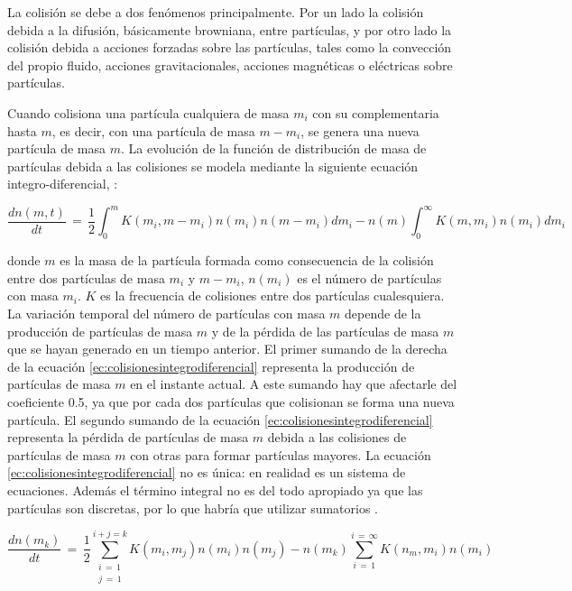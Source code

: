 \par La colisión se debe a dos fenómenos principalmente. Por un lado la colisión debida a la difusión, básicamente browniana, entre partículas, y por otro lado la colisión debida a acciones forzadas sobre las partículas, tales como la convección del propio fluido, acciones gravitacionales, acciones magnéticas o eléctricas sobre partículas.

\par Cuando colisiona una partícula cualquiera de masa $m_i$ con su complementaria hasta $m$, es decir, con una partícula de masa $m - m_i$, se genera una nueva partícula de masa $m$. La evolución de la función de distribución de masa de partículas debida a las colisiones se modela mediante la siguiente ecuación integro-diferencial, \cite{fuchs:1989}:

\begin{equation}
\label{ec:colisionesintegrodiferencial}
\dfrac{dn(m,t)}{dt}\,=\, \frac{1}{2} \int_0^m K(m_i,m-m_i)n(m_i)n(m-m_i)dm_i-n(m)\int_0^\infty K(m,m_i)n(m_i)dm_i
\end{equation}

donde $m$ es la masa de la partícula formada como consecuencia de la colisión entre dos partículas de masa $m_i$ y $m-m_i$, $n(m_i)$ es el número de partículas con masa $m_i$. $K$ es la frecuencia de colisiones entre dos partículas cualesquiera. La variación temporal del número de partículas con masa $m$ depende de la producción de partículas de masa $m$ y de la pérdida de las partículas de masa $m$ que se hayan generado en un tiempo anterior. El primer sumando de la derecha de la ecuación \ref{ec:colisionesintegrodiferencial} representa la producción de partículas de masa $m$ en el instante actual. A este sumando hay que afectarle del coeficiente 0.5, ya que por cada dos partículas que colisionan se forma una nueva partícula. El segundo sumando de la ecuación \ref{ec:colisionesintegrodiferencial} representa la pérdida de partículas de masa $m$ debida a las colisiones de partículas de masa $m$ con otras para formar partículas mayores. La ecuación \ref{ec:colisionesintegrodiferencial} no es única: en realidad es un sistema de ecuaciones. Además el término integral no es del todo apropiado ya que las partículas son discretas, por lo que habría que utilizar sumatorios \cite{friedlander:2000}.

\begin{equation}
\label{ec:colisionessumatorio}
\dfrac{dn(m_k)}{dt}\,=\, \frac{1}{2} \sum_{\substack{i\,=\,1 \\ j\,=\,1}}^{i+j=k} K(m_i,m_j)n(m_i)n(m_j)-n(m_k)\sum_{i\,=\,1}^{i\,=\, \infty} K(n_m,m_i)n(m_i)
\end{equation}

